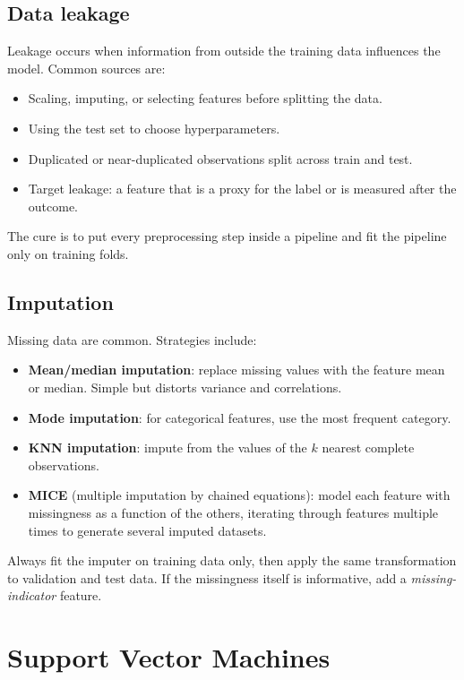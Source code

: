 \documentclass[a4paper, 12pt]{book}
\begin{document}
\section{Data leakage}

Leakage occurs when information from outside the training data influences the model.
Common sources are:
\begin{itemize}
    \item Scaling, imputing, or selecting features before splitting the data.
    \item Using the test set to choose hyperparameters.
    \item Duplicated or near-duplicated observations split across train and test.
    \item Target leakage: a feature that is a proxy for the label or is measured after
    the outcome.
\end{itemize}
The cure is to put every preprocessing step inside a pipeline and fit the pipeline
only on training folds.

\section{Imputation}

Missing data are common. Strategies include:
\begin{itemize}
    \item \textbf{Mean/median imputation}: replace missing values with the feature mean
    or median. Simple but distorts variance and correlations.
    \item \textbf{Mode imputation}: for categorical features, use the most frequent
    category.
    \item \textbf{KNN imputation}: impute from the values of the $k$ nearest complete
    observations.
    \item \textbf{MICE} (multiple imputation by chained equations): model each feature
    with missingness as a function of the others, iterating through features multiple
    times to generate several imputed datasets.
\end{itemize}
Always fit the imputer on training data only, then apply the same transformation to
validation and test data. If the missingness itself is informative, add a
\emph{missing-indicator} feature.


\chapter{Support Vector Machines}
\label{ch:svm}
\end{document}
